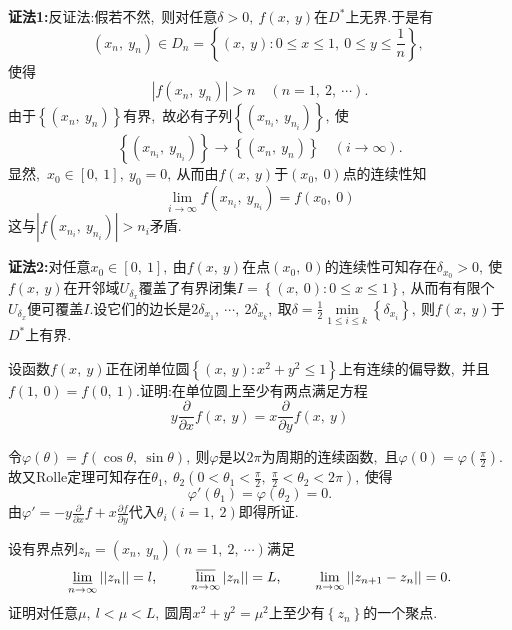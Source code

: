 	\begin{solution}
		\textbf{证法1:}反证法:假若不然,\ 则对任意$\delta>0,\ f(x,\ y)$在$D^*$上无界.于是有
		$$(x_n,\ y_n)\in D_n=\left\{(x,\ y):0\le x\le 1,\ 0\le y\le \frac{1}{n}\right\},\ $$
		使得
		$$\left|f(x_n,\ y_n)\right|>n\quad (n=1,\ 2,\ \cdots).$$
		由于$\left\{(x_n,\ y_n)\right\}$有界,\ 故必有子列$\left\{(x_{n_i},\ y_{n_i})\right\},\ $使
		$$\left\{(x_{n_i},\ y_{n_i})\right\}\rightarrow\left\{(x_n,\ y_n)\right\}\quad (i\rightarrow\infty).$$
		显然,\ $x_0\in\left[0,\ 1\right],\ y_0=0,\ $从而由$f(x,\ y)$于$(x_0,\ 0)$点的连续性知
		$$\lim\limits_{i\rightarrow\infty}f(x_{n_i},\ y_{n_i})=f(x_0,\ 0)$$
		这与$\left|f(x_{n_i},\ y_{n_i})\right|>n_i$矛盾. 
		
		\textbf{证法2:}对任意$x_0\in\left[0,\ 1\right],\ $由$f(x,\ y)$在点$\left(x_0,\ 0\right)$的连续性可知存在$\delta_{x_0}>0,\ $使$f(x,\ y)$在开邻域$U_{\delta_x}$覆盖了有界闭集$I=\left\{(x,\ 0):0\le x\le 1\right\},\ $从而有有限个$U_{\delta_x}$便可覆盖$I.$设它们的边长是$2\delta_{x_1},\ \cdots,\ 2\delta_{x_k},\ $取$\delta=\frac{1}{2}\min\limits_{1\le i\le k}\left\{\delta_{x_i}\right\},\ $则$f(x,\ y)$于$D^*$上有界. 
	\end{solution}
	\newpage
	\begin{problem}
		设函数$f(x,\ y)$正在闭单位圆$\left\{(x,\ y):x^2+y^2\le 1\right\}$上有连续的偏导数,\ 并且$f(1,\ 0)=f(0,\ 1).$证明:在单位圆上至少有两点满足方程
		$$y\frac{\partial}{\partial x}f(x,\ y)=x\frac{\partial}{\partial y}f(x,\ y)$$
	\end{problem}
	
	\begin{solution}
		令$\varphi(\theta)=f(\cos\theta,\ \sin\theta),\ $则$\varphi$是以$2\pi$为周期的连续函数,\ 且$\varphi(0)=\varphi(\frac{\pi}{2}).$故又Rolle定理可知存在$\theta_1,\ \theta_2(0<\theta_1<\frac{\pi}{2},\ \frac{\pi}{2}<\theta_2<2\pi),\ $使得
		$$\varphi'(\theta_1)=\varphi(\theta_2)=0.$$
		由$\varphi'=-y\frac{\partial}{\partial x}f+x\frac{\partial f}{\partial y}$代入$\theta_i(i=1,\ 2)$即得所证. 
	\end{solution}
	\newpage
	\begin{problem}
		设有界点列$z_n=(x_n,\ y_n)(n=1,\ 2,\ \cdots)$满足
		$$\varliminf\limits_{n\rightarrow\infty}||z_n||=l,\ \qquad \varlimsup\limits_{n\rightarrow\infty}|z_n||=L,\ \qquad\lim\limits_{n\rightarrow\infty}||z_{n+1}-z_n||=0.$$
		证明对任意$\mu,\ l<\mu<L,\ $圆周$x^2+y^2=\mu^2$上至少有$\left\{z_n\right\}$的一个聚点.
	\end{problem}
	
